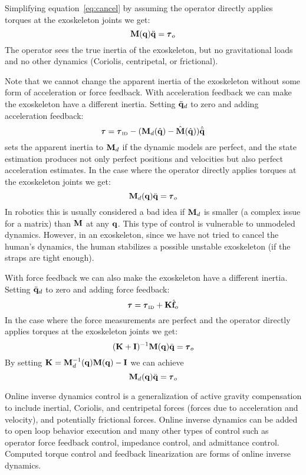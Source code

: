 \documentclass[letterpaper,12pt,fullpage]{article}
\newcommand{\invdyn}{{\mbox {\tiny ID}}}
\begin{document}
Simplifying equation~\ref{eq:cancel} by 
assuming the operator directly applies torques at the
exoskeleton joints we get:
\begin{equation}
\mM (\vq) \ddot{\vq} = \vtau_o
\end{equation}
The operator sees the true inertia of the exoskeleton, but no gravitational
loads and no other dynamics (Coriolis, centripetal, or frictional).

Note that we cannot change the apparent inertia of the exoskeleton without
some form of acceleration or force feedback.
With acceleration feedback we can make the exoskeleton have a different inertia.
Setting $\ddot{{\bf q}}_d$ to zero and adding acceleration feedback:
\begin{equation}
\vtau = \vtau_{\invdyn} - (\mM_d(\hat{\vq}) - \hat{\mM}(\hat{\vq})) \hat{\ddot{\vq}}
\label{eq:change-inertia1}
\end{equation}
sets the apparent inertia to ${\bf M}_d$ if the dynamic models are perfect, and
the state estimation produces not only perfect positions and velocities but
also perfect acceleration estimates. In the case 
where the operator directly applies torques at the
exoskeleton joints we get:
\begin{equation}
\mM_d (\vq) \ddot{\vq} = \vtau_o
\end{equation}
In robotics this is usually considered a bad idea if ${\bf M}_d$ is smaller (a complex
issue for a matrix) than ${\bf M}$ at any ${\bf q}$. This type of control is vulnerable
to unmodeled dynamics. However, in an exoskeleton, since we have not tried to
cancel the human's dynamics, the human stabilizes a possible unstable exoskeleton
(if the straps are tight enough).

With force feedback we can also make the exoskeleton have a different inertia.
Setting $\ddot{{\bf q}}_d$ to zero and adding force feedback:
\begin{equation}
\vtau = \vtau_{\invdyn} + \mK \hat{\vf}_o
\end{equation}
In the case where the force measurements are perfect and 
the operator directly applies torques at the
exoskeleton joints we get:
\begin{equation}
(\mK + \mI)^{-1} \mM (\vq) \ddot{\vq} = \vtau_o
\end{equation}
By setting ${\bf K} = {\bf M}^{-1}_d ({\bf q}) {\bf M} ({\bf q}) - {\bf I}$ we can achieve
\begin{equation}
\mM_d (\vq) \ddot{\vq} = \vtau_o
\end{equation}

Online inverse dynamics control is a generalization of 
active gravity compensation to include
inertial, Coriolis, and centripetal forces (forces due to acceleration and
velocity), and potentially frictional forces.
Online inverse dynamics can be added to open loop behavior execution
and many other types of control such as operator force
feedback control, impedance control, and admittance control.
Computed torque control and feedback linearization are forms of online
inverse dynamics.
\end{document}
